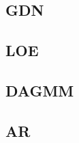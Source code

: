 \documentclass[../../main/main.tex]{subfiles}
\begin{document}
    \subsection{\acf{GDN}}
            

    \subsection{\acf{LOE}}\label{sect:contamination}
          

    \subsection{\acf{DAGMM}}
        

    \subsection{\acf{AR}}
        
\end{document}
